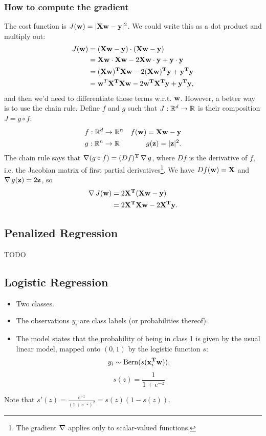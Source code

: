 \documentclass[12pt]{article}
\begin{document}
\subsubsection*{How to compute the gradient}

The cost function is $J(\mathbf w) = |\mathbf X\mathbf w - \mathbf y|^2$. We could write this as a dot product and
multiply out:
\begin{align*}
  J(\mathbf w) &= (\mathbf X\mathbf w - \mathbf y) \cdot (\mathbf X\mathbf w - \mathbf y) \\
  &= \mathbf X\mathbf w \cdot \mathbf X\mathbf w - 2 \mathbf X\mathbf w \cdot \mathbf y + \mathbf y \cdot \mathbf y \\
  &= (\mathbf X\mathbf w)^{\mathbf{T}} \mathbf X\mathbf w - 2 (\mathbf X\mathbf w)^{\mathbf{T}} \mathbf y + \mathbf y^{\mathbf{T}} \mathbf y \\
  &= \mathbf w^T\mathbf X^{\mathbf{T}}\mathbf X\mathbf w - 2 \mathbf w^{\mathbf{T}}\mathbf X^{\mathbf{T}}\mathbf y + \mathbf y^{\mathbf{T}} \mathbf y,
\end{align*}
and then we'd need to differentiate those terms w.r.t. $\mathbf w$. However, a better
way is to use the chain rule. Define $f$ and $g$ such that
$J: \mathbb{R}^d \rightarrow \mathbb{R}$ is their composition $J = g \circ f$:
\begin{align*}
  &f: \mathbb{R}^d \rightarrow \mathbb{R}^n     &f(\mathbf w) = \mathbf X\mathbf w - \mathbf y \\
  &g: \mathbb{R}^n \rightarrow \mathbb{R}       &g(\mathbf z) = |\mathbf z|^2.
\end{align*}
The chain rule says that $\operatorname{\nabla} (g \circ f) = (D f)^{\mathbf{T}} \operatorname{\nabla} g$, where $D f$ is
the derivative of $f$, i.e. the Jacobian matrix of first partial
derivatives\footnote{The gradient $\operatorname{\nabla}$ applies only to scalar-valued
functions.}. We have $D f(\mathbf w) = \mathbf X$ and $\operatorname{\nabla} g(\mathbf z) = 2\mathbf z$, so
\begin{align*}
  \operatorname{\nabla} J(\mathbf w)
  &= 2\mathbf X^{\mathbf{T}}(\mathbf X\mathbf w - \mathbf y) \\
  &= 2\mathbf X^{\mathbf{T}}\mathbf X\mathbf w - 2\mathbf X^{\mathbf{T}}\mathbf y.
\end{align*}

\subsection*{Penalized Regression}
TODO

\subsection*{Logistic Regression}

\begin{itemize}
\item Two classes.
\item The observations $y_i$ are class labels (or probabilities thereof).
\item The model states that the probability of being in class 1 is given by the
  usual linear model, mapped onto $(0, 1)$ by the logistic function $s$:
  $$y_i \sim \operatorname{\text{Bern}}(s(\mathbf x_i^{\mathbf{T}}\mathbf w)),$$
  $$s(z) = \frac{1}{1 + e^{-z}}$$
\end{itemize}
Note that $s'(z) = \frac{e^{-z}}{(1 + e^{-z})^2} = s(z)(1 - s(z))$.
\end{document}
